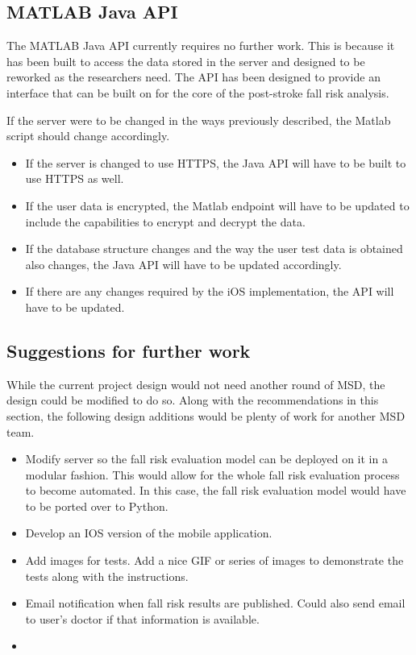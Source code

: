 \documentclass[conference]{IEEEtran}
\begin{document}
\subsection{MATLAB Java API}

The MATLAB Java API currently requires no further work. This is because it has been built to access the data stored in the server and designed to be reworked as the researchers need. The API has been designed to provide an interface that can be built on for the core of the post-stroke fall risk analysis.

If the server were to be changed in the ways previously described, the Matlab script should change accordingly.

\begin{itemize}
    \item If the server is changed to use HTTPS, the Java API will have to be built to use HTTPS as well.
    \item If the user data is encrypted, the Matlab endpoint will have to be updated to include the capabilities to encrypt and decrypt the data.
    \item If the database structure changes and the way the user test data is obtained also changes, the Java API will have to be updated accordingly. 
    \item If there are any changes required by the iOS implementation, the API will have to be updated. 
\end{itemize}

\subsection{Suggestions for further work}

While the current project design would not need another round of MSD, the design could be modified to do so. Along with the recommendations in this section, the following design additions would be plenty of work for another MSD team.

\begin{itemize}
    \item Modify server so the fall risk evaluation model can be deployed on it in a modular fashion. This would allow for the whole fall risk evaluation process to become automated. In this case, the fall risk evaluation model would have to be ported over to Python.
    \item Develop an IOS version of the mobile application.
    \item Add images for tests. Add a nice GIF or series of images to demonstrate the tests along with the instructions.
    \item Email notification when fall risk results are published. Could also send email to user's doctor if that information is available.
    \item 
\end{itemize}
\end{document}
